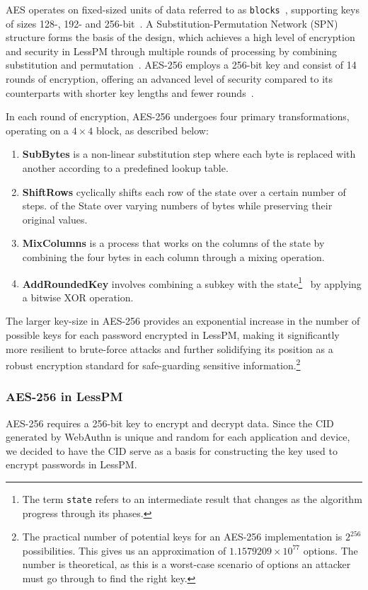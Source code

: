 AES operates on fixed-sized units of data referred to as
\texttt{blocks}~\cite{nistfips197blocks}, supporting keys of sizes 128-, 192-
and 256-bit~\cite{nistfips197intro}.
A Substitution-Permutation Network (SPN) structure forms the basis of the
design, which achieves a high level of encryption and security in LessPM
through multiple rounds of processing by combining substitution and
permutation~\cite{nistfips197specification}.
AES-256 employs a 256-bit key and consist of 14 rounds of encryption, offering
an advanced level of security compared to its counterparts with shorter key
lengths and fewer rounds~\cite{nistfips197256}.

In each round of encryption, AES-256 undergoes four primary transformations,
operating on a $4\times4$ block, as described below:
\newpage

  \begin{enumerate}
    \item \textbf{SubBytes} is a non-linear substitution step where each byte is
    replaced with another according to a predefined lookup table.
    \item \textbf{ShiftRows} cyclically shifts each row of the state over a
    certain number of steps.
    of the State over varying numbers of bytes while preserving their original
    values.
    \item \textbf{MixColumns} is a process that works on the columns of the
    state by combining the four bytes in each column through a mixing operation.
    \item \textbf{AddRoundedKey} involves combining a subkey with the state\footnote{
      The term \texttt{state} refers to an intermediate result that changes as
      the algorithm progress through its phases.
    }
    ~by applying a bitwise XOR operation.
  \end{enumerate}

The larger key-size in AES-256 provides an exponential increase in the number
of possible keys for each password encrypted in LessPM, making it
significantly more resilient to brute-force attacks and further solidifying
its position as a robust encryption standard for safe-guarding sensitive
information.\footnote{
  The practical number of potential keys for an AES-256 implementation is
  $2^{256}$ possibilities. This gives us an approximation of
  $1.1579209 \times 10^{77}$ options.
  The number is theoretical, as this is a worst-case scenario of options an
  attacker must go through to find the right key.
}

\subsubsection{AES-256 in LessPM}
AES-256 requires a 256-bit key to encrypt and decrypt data.
Since the CID generated by WebAuthn is unique and random for each application
and device, we decided to have the CID serve as a basis for constructing the
key used to encrypt passwords in LessPM\@.

